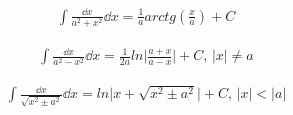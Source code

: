 \begin{align*}
    \int \frac{\dd x}{a^2+x^2} \dd x = \frac{1}{a}arctg\left(\frac{x}{a}\right) + C
\end{align*}

\begin{align*}
    \int \frac{\dd x}{a^2-x^2} \dd x = \frac{1}{2a}ln\bigg|\frac{a+x}{a-x}\bigg| + C, \, |x| \neq a
\end{align*}

\begin{align*}
    \int \frac{\dd x}{\sqrt{x^2 \pm a^2}} \dd x = ln\big|x+\sqrt{x^2 \pm a^2}\big| + C, \, |x| < |a|
\end{align*}
